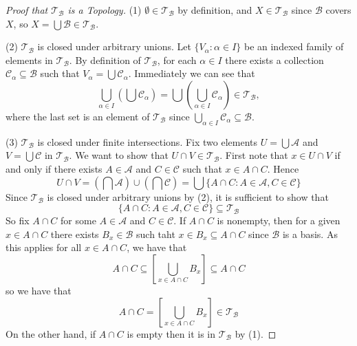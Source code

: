 \documentclass[12pt, a4paper, oneside, openright, titlepage]{book}
\begin{document}
\begin{proof}[Proof that $\mathcal{T}_{\mathcal{B}}$ is a Topology]
    (1) $\emptyset \in \mathcal{T}_{\mathcal{B}}$ by definition, and $X \in \mathcal{T}_{\mathcal{B}}$ since $\mathcal{B}$ covers $X$, so $X = \bigcup\mathcal{B} \in \mathcal{T}_{\mathcal{B}}$.

    
    (2) $\mathcal{T}_{\mathcal{B}}$ is closed under arbitrary unions. Let $\{V_{\alpha}:\alpha \in I\}$ be an indexed family of elements in $\mathcal{T}_{\mathcal{B}}$. By definition of $\mathcal{T}_{\mathcal{B}}$, for each $\alpha \in I$ there exists a collection $\mathcal{C}_{\alpha} \subseteq \mathcal{B}$ such that $V_{\alpha} = \bigcup\mathcal{C}_{\alpha}$. Immediately we can see that \begin{equation*}
        \bigcup\limits_{\alpha\in I}\left(\bigcup\mathcal{C}_{\alpha}\right) = \bigcup\left(\bigcup\limits_{\alpha \in I}\mathcal{C}_{\alpha}\right) \in \mathcal{T}_{\mathcal{B}},
    \end{equation*}
    where the last set is an element of $\mathcal{T}_{\mathcal{B}}$ since $\bigcup_{\alpha \in I}\mathcal{C}_{\alpha} \subseteq \mathcal{B}$. 


    (3) $\mathcal{T}_{\mathcal{B}}$ is closed under finite intersections. Fix two elements $U = \bigcup\mathcal{A}$ and $V = \bigcup\mathcal{C}$ in $\mathcal{T}_{\mathcal{B}}$. We want to show that $U\cap V \in \mathcal{T}_{\mathcal{B}}$. First note that $x \in U\cap V$ if and only if there exists $A \in \mathcal{A}$ and $C \in \mathcal{C}$ such that $x \in A\cap C$. Hence \begin{equation*}
        U\cap V = \left(\bigcap\mathcal{A}\right)\cup\left(\bigcap\mathcal{C}\right) = \bigcup\{A\cap C:A\in\mathcal{A},C\in\mathcal{C}\}
    \end{equation*}
    Since $\mathcal{T}_{\mathcal{B}}$ is closed under arbitrary unions by (2), it is sufficient to show that \begin{equation*}
        \{A\cap C:A \in \mathcal{A},C\in\mathcal{C}\}\subseteq \mathcal{T}_{\mathcal{B}}
    \end{equation*}
    So fix $A\cap C$ for some $A \in \mathcal{A}$ and $C \in \mathcal{C}$. If $A\cap C$ is nonempty, then for a given $x \in A\cap C$ there exists $B_x \in \mathcal{B}$ such taht $x \in B_x \subseteq A\cap C$ since $\mathcal{B}$ is a basis. As this applies for all $x \in A\cap C$, we have that \begin{equation*}
        A\cap C\subseteq \left[\bigcup\limits_{x\in A\cap C}B_x\right]\subseteq A\cap C
    \end{equation*}
    so we have that \begin{equation*}
        A\cap C = \left[\bigcup\limits_{x\in A\cap C}B_x\right] \in \mathcal{T}_{\mathcal{B}}
    \end{equation*}
    On the other hand, if $A\cap C$ is empty then it is in $\mathcal{T}_{\mathcal{B}}$ by (1).
\end{proof}
\end{document}
